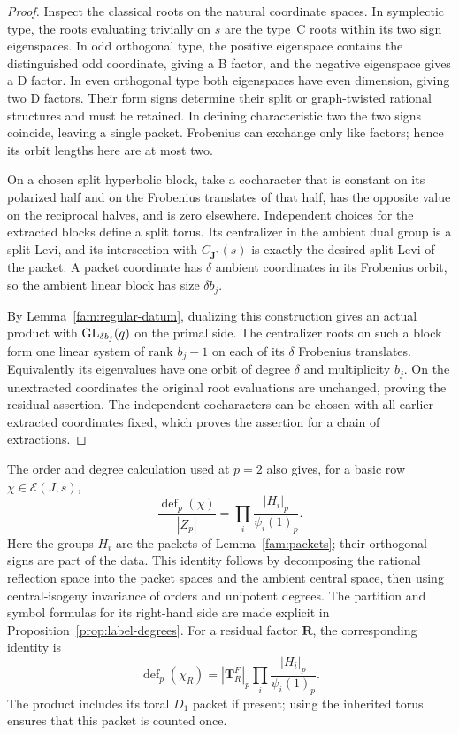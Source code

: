 \begin{proof}
Inspect the classical roots on the natural coordinate spaces.
In symplectic type, the roots evaluating trivially on \(s\)
are the type~C roots within its two sign eigenspaces.  In odd
orthogonal type, the positive eigenspace contains the distinguished
odd coordinate, giving a B factor, and the negative eigenspace
gives a D factor.  In even orthogonal type both eigenspaces
have even dimension, giving two D factors.  Their form signs
determine their split or graph-twisted rational structures and
must be retained.  In defining characteristic two the two signs
coincide, leaving a single packet.  Frobenius can exchange only
like factors; hence its orbit lengths here are at most two.

On a chosen split hyperbolic block, take a cocharacter that is
constant on its polarized half and on the Frobenius translates
of that half, has the opposite value on the reciprocal halves,
and is zero elsewhere.  Independent choices for the extracted
blocks define a split torus.  Its centralizer in the ambient
dual group is a split Levi, and its intersection with
\(C_{\mathbf J^*}(s)\) is exactly the desired split Levi of
the packet.  A packet coordinate has \(\delta\) ambient
coordinates in its Frobenius orbit, so the ambient linear
block has size \(\delta b_j\).

By Lemma~\ref{fam:regular-datum}, dualizing this construction
gives an actual product with \(\operatorname{GL}_{\delta b_j}(q)\) on the
primal side.  The centralizer roots on such a block form one
linear system of rank \(b_j-1\) on each of its \(\delta\)
Frobenius translates.  Equivalently its eigenvalues have one
orbit of degree \(\delta\) and multiplicity \(b_j\).
On the unextracted coordinates the original root evaluations
are unchanged, proving the residual assertion.  The independent
cocharacters can be chosen with all earlier extracted coordinates
fixed, which proves the assertion for a chain of extractions.
\end{proof}

The order and degree calculation used at \(p=2\) also gives,
for a basic row \(\chi\in\mathcal E(J,s)\),
\begin{equation}\label{fam:packet-defect}
 \frac{\operatorname{def}_p(\chi)}{|Z_p|}
       =\prod_i\frac{|H_i|_p}{\psi_i(1)_p}.
\end{equation}
Here the groups \(H_i\) are the packets of
Lemma~\ref{fam:packets}; their orthogonal signs are part of the
data.  This identity follows by decomposing the rational
reflection space into the packet spaces and the ambient central
space, then using central-isogeny invariance of orders and
unipotent degrees.  The partition and symbol formulas for its
right-hand side are made explicit in
Proposition~\ref{prop:label-degrees}.
For a residual factor \(\mathbf R\), the corresponding identity is
\[
 \operatorname{def}_p(\chi_R)
  =|\mathbf T_R^F|_p
        \prod_i\frac{|H_i|_p}{\psi_i(1)_p}.
\]
The product includes its toral \(D_1\) packet if present;
using the inherited torus ensures that this packet is counted once.

